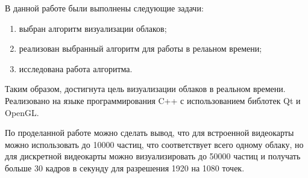 \Conclusion %

В данной работе были выполнены следующие задачи:

\begin{enumerate}
    \item выбран алгоритм визуализации облаков;
    \item реализован выбранный алгоритм для работы в релаьном времени;
    \item исследована работа алгоритма.
\end{enumerate}

Таким образом, достигнута цель визуализации облаков в реальном времени. Реализовано на языке
программирования C++ с использованием библотек Qt и OpenGL.

По проделанной работе можно сделать вывод, что для встроенной видеокарты можно использовать до 10000
частиц, что соответствует всего одному облаку, но для дискретной видеокарты можно визуализировать
до 50000 частиц и получать больше 30 кадров в секунду для разрешения 1920 на 1080 точек.
